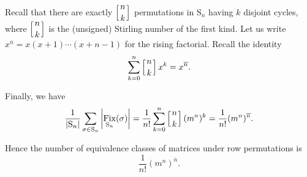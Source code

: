 \documentclass[a4paper,12pt]{report}
\DeclareMathOperator{\Fix}{Fix}
\begin{document}
Recall that there are exactly $\displaystyle\left[{n \atop k}\right]$ permutations in $\mathrm{S}_n$ having $k$ disjoint cycles, where $\displaystyle\left[{n \atop k}\right]$ is the (unsigned) Stirling number of the first kind. Let us write $x^{\overline{n}}=x(x+1)\cdots(x+n-1)$ for the rising factorial. Recall the identity 
\[
\sum_{k=0}^{n} \left[{n \atop k}\right] x^k=x^{\overline{n}}.
\]

Finally, we have
\[
    \frac{1}{|\mathrm{S}_n|}\sum_{\sigma\in \mathrm{S}_n} \left|\Fix_{\mathrm{S}_n}(\sigma)\right| =\frac{1}{n!}\sum_{k=0}^n \left[{n \atop k}\right] (m^n)^k =\frac{1}{n!}(m^n)^{\overline{n}}.
\]

Hence the number of equivalence classes of matrices under row permutations is 
\[
\boxed{\frac{1}{n!}(m^n)^{\overline{n}}}.
\]
\end{document}
